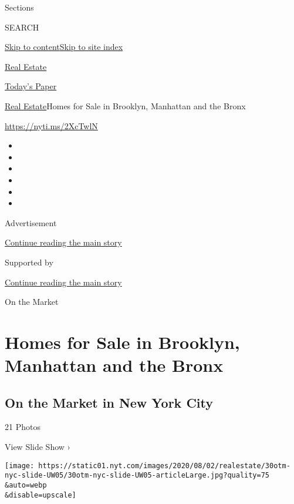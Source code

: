 Sections

SEARCH

\protect\hyperlink{site-content}{Skip to
content}\protect\hyperlink{site-index}{Skip to site index}

\href{https://www.nytimes.com/section/realestate}{Real Estate}

\href{https://myaccount.nytimes.com/auth/login?response_type=cookie\&client_id=vi}{}

\href{https://www.nytimes.com/section/todayspaper}{Today's Paper}

\href{/section/realestate}{Real Estate}\textbar{}Homes for Sale in
Brooklyn, Manhattan and the Bronx

\url{https://nyti.ms/2XcTwlN}

\begin{itemize}
\item
\item
\item
\item
\item
\item
\end{itemize}

Advertisement

\protect\hyperlink{after-top}{Continue reading the main story}

Supported by

\protect\hyperlink{after-sponsor}{Continue reading the main story}

On the Market

\hypertarget{homes-for-sale-in-brooklyn-manhattan-and-the-bronx}{%
\section{Homes for Sale in Brooklyn, Manhattan and the
Bronx}\label{homes-for-sale-in-brooklyn-manhattan-and-the-bronx}}

\href{https://www.nytimes.com/slideshow/2020/07/30/realestate/on-the-market-in-new-york-city.html}{}

\hypertarget{on-the-market-in-new-york-city}{%
\subsection{On the Market in New York
City}\label{on-the-market-in-new-york-city}}

21 Photos

View Slide Show ›

\texttt{[image: https://static01.nyt.com/images/2020/08/02/realestate/30otm-nyc-slide-UW05/30otm-nyc-slide-UW05-articleLarge.jpg?quality=75\\\&auto=webp\\\&disable=upscale]}

